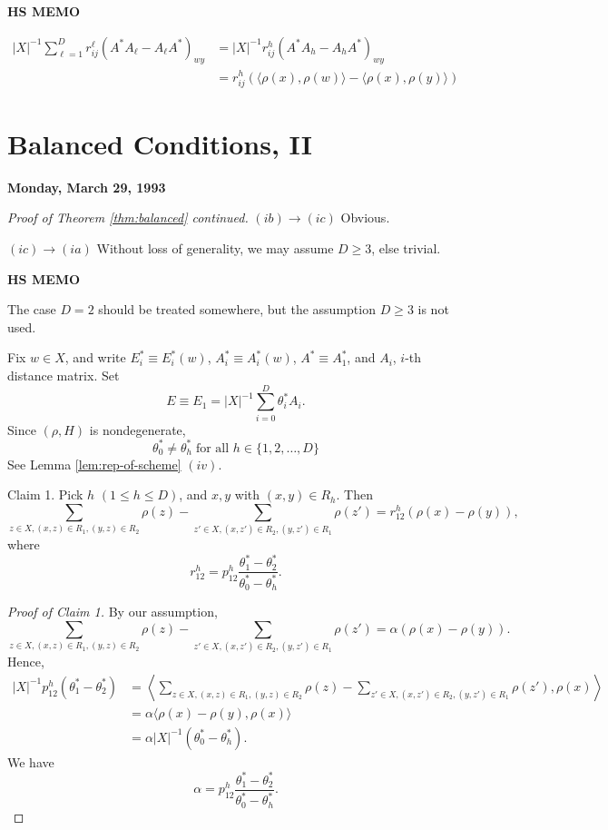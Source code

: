 \documentclass[
]{book}
\theoremstyle{definition}
\theoremstyle{definition}
\theoremstyle{definition}
\theoremstyle{definition}
\theoremstyle{remark}
\begin{document}
\textbf{HS MEMO}

\begin{align}
|X|^{-1}\sum_{\ell=1}^D r^\ell_{ij}(A^*A_\ell - A_\ell A^*)_{wy} & = |X|^{-1}r^h_{ij}(A^*A_h- A_hA^*)_{wy}\\
& = r^h_{ij}(\langle \rho(x),\rho(w)\rangle - \langle \rho(x),\rho(y)\rangle)
\end{align}

\hypertarget{lec25}{%
\chapter{Balanced Conditions, II}\label{lec25}}

\textbf{Monday, March 29, 1993}

\begin{proof}[Proof of Theorem \ref{thm:balanced} continued]
\leavevmode

\((ib)\to(ic)\) Obvious.

\((ic)\to(ia)\) Without loss of generality, we may assume \(D\geq 3\), else trivial.

\textbf{HS MEMO}

The case \(D = 2\) should be treated somewhere, but the assumption \(D\geq 3\) is not used.

Fix \(w\in X\), and write \(E^*_i \equiv E^*_i(w)\), \(A^*_i\equiv A^*_i(w)\), \(A^*\equiv A^*_1\), and \(A_i\), \(i\)-th distance matrix. Set
\[E \equiv E_1 = |X|^{-1}\sum_{i=0}^D \theta^*_i A_i.\]
Since \((\rho, H)\) is nondegenerate,
\[\theta^*_0 \neq \theta^*_h \; \text{for all }h\in \{1,2,\ldots, D\}\]
See Lemma \ref{lem:rep-of-scheme} \((iv)\).

Claim 1. Pick \(h\) \((1\leq h\leq D)\), and \(x,y\) with \((x,y)\in R_h\). Then
\[\sum_{z\in X, (x,z)\in R_1, (y,z)\in R_2}\rho(z) - \sum_{z'\in X, (x,z')\in R_2, (y,z')\in R_1}\rho(z') = r^h_{12}(\rho(x)-\rho(y)),\]
where
\[r^h_{12} = p^h_{12}\frac{\theta_1^* - \theta^*_2}{\theta^*_0-\theta^*_h}.\]

\emph{Proof of Claim 1.}
By our assumption,
\[\sum_{z\in X, (x,z)\in R_1, (y,z)\in R_2}\rho(z) - \sum_{z'\in X, (x,z')\in R_2, (y,z')\in R_1}\rho(z') = \alpha(\rho(x)-\rho(y)).\]
Hence,
\begin{align}
|X|^{-1}p^h_{12}(\theta^*_1-\theta^*_2) & = \left\langle \sum_{z\in X, (x,z)\in R_1, (y,z)\in R_2}\rho(z) - \sum_{z'\in X, (x,z')\in R_2, (y,z')\in R_1}\rho(z'), \rho(x)\right\rangle \\
& = \alpha\langle \rho(x)-\rho(y), \rho(x)\rangle\\
& = \alpha |X|^{-1}(\theta_0^*-\theta^*_h).
\end{align}
We have
\[\alpha = p^h_{12}\frac{\theta_1^* - \theta^*_2}{\theta^*_0-\theta^*_h}.\]


\end{proof}
\end{document}
